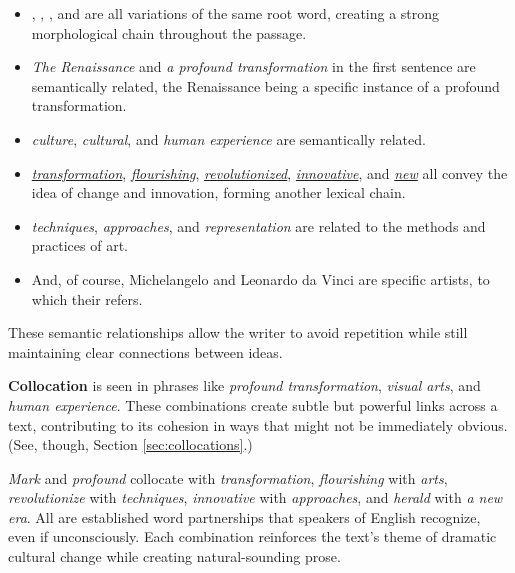 \begin{itemize}[noitemsep]
    \item \textit{}, \textit{}, \textit{}, and \textit{} are all variations of the same root word, creating a strong morphological chain throughout the passage.
    
    \item \textit{\textcolor{xGreen}{The Renaissance}} and \textit{\textcolor{xGreen}{a profound transformation}} in the first sentence are semantically related, the Renaissance being a specific instance of a profound transformation.
    
    \item \textit{\textcolor{xPurple}{culture}}, \textit{\textcolor{xPurple}{cultural}}, and \textit{\textcolor{xPurple}{human experience}} are semantically related.
    
    \item \textit{\uline{transformation}}, \textit{\uline{flourishing}}, \textit{\uline{revolutionized}}, \textit{\uline{innovative}}, and \textit{\uline{new}} all convey the idea of change and innovation, forming another lexical chain.
    
    \item \textit{\textcolor{xPink}{techniques}}, \textit{\textcolor{xPink}{approaches}}, and \textit{\textcolor{xPink}{representation}} are related to the methods and practices of art.

    \item And, of course, \textcolor{xOrange}{Michelangelo} and  \textcolor{xOrange}{Leonardo da Vinci} are specific \textcolor{xOrange}{artists}, to which \textcolor{xOrange}{their} refers.
\end{itemize}
These semantic relationships allow the writer to avoid repetition while still maintaining clear connections between ideas.

\textbf{Collocation} is seen in phrases like \textit{profound transformation}, \textit{visual arts}, and \textit{human experience}. These combinations create subtle but powerful links across a text, contributing to its cohesion in ways that might not be immediately obvious. (See, though, Section \ref{sec:collocations}.)

\textit{Mark} and \textit{profound} collocate with \textit{ transformation}, \textit{flourishing }with\textit{ arts}, \textit{revolutionize }with\textit{ techniques}, \textit{innovative }with\textit{ approaches}, and \textit{herald }with \textit{a new era}. All are established word partnerships that speakers of English recognize, even if unconsciously. Each combination reinforces the text's theme of dramatic cultural change while creating natural-sounding prose.

